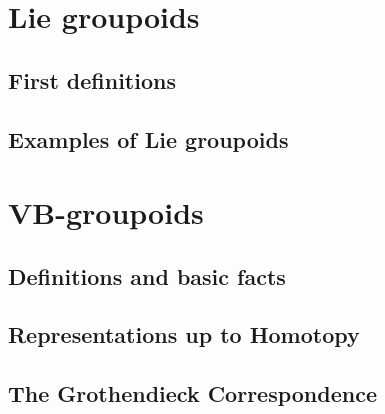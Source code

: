 
\chapter{Lie groupoids}\label{ch:lie-gpds}

\section{First definitions}



\section{Examples of Lie groupoids}








\chapter{VB-groupoids}\label{ch:vb-gpds}

\section{Definitions and basic facts}\label{sec:VBgpds}



\section{Representations up to Homotopy}



\section{The Grothendieck Correspondence}\label{sec:groth-corresp}

